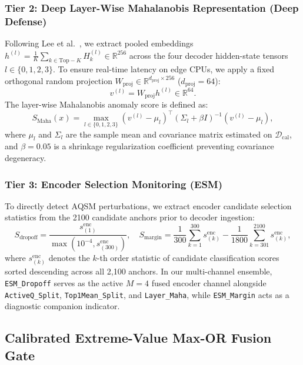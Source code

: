 \documentclass[preprint,12pt]{elsarticle}
\begin{document}
\subsubsection{Tier 2: Deep Layer-Wise Mahalanobis Representation (Deep Defense)}
Following Lee et al.~\cite{lee2018simple}, we extract pooled embeddings $h^{(l)} = \frac{1}{K} \sum_{k \in \mathrm{Top-}K} H_k^{(l)} \in \mathbb{R}^{256}$ across the four decoder hidden-state tensors $l \in \{0, 1, 2, 3\}$. To ensure real-time latency on edge CPUs, we apply a fixed orthogonal random projection $W_{\mathrm{proj}} \in \mathbb{R}^{d_{\mathrm{proj}} \times 256}$ ($d_{\mathrm{proj}} = 64$):
\begin{equation}
    v^{(l)} = W_{\mathrm{proj}} h^{(l)} \in \mathbb{R}^{64}.
\end{equation}
The layer-wise Mahalanobis anomaly score is defined as:
\begin{equation}
    S_{\mathrm{Maha}}(x) = \max_{l \in \{0, 1, 2, 3\}} \left( v^{(l)} - \mu_l \right)^\top \left( \Sigma_l + \beta I \right)^{-1} \left( v^{(l)} - \mu_l \right),
\end{equation}
where $\mu_l$ and $\Sigma_l$ are the sample mean and covariance matrix estimated on $\mathcal{D}_{\mathrm{cal}}$, and $\beta = 0.05$ is a shrinkage regularization coefficient preventing covariance degeneracy.

\subsubsection{Tier 3: Encoder Selection Monitoring (ESM)}
To directly detect AQSM perturbations, we extract encoder candidate selection statistics from the 2100 candidate anchors prior to decoder ingestion:
\begin{equation}
    S_{\mathrm{dropoff}} = \frac{s_{(1)}^{\mathrm{enc}}}{\max(10^{-4}, s_{(300)}^{\mathrm{enc}})}, \quad S_{\mathrm{margin}} = \frac{1}{300}\sum_{k=1}^{300} s_{(k)}^{\mathrm{enc}} - \frac{1}{1800}\sum_{k=301}^{2100} s_{(k)}^{\mathrm{enc}},
\end{equation}
where $s_{(k)}^{\mathrm{enc}}$ denotes the $k$-th order statistic of candidate classification scores sorted descending across all 2,100 anchors. In our multi-channel ensemble, \texttt{ESM\_Dropoff} serves as the active $M=4$ fused encoder channel alongside \texttt{ActiveQ\_Split}, \texttt{Top1Mean\_Split}, and \texttt{Layer\_Maha}, while \texttt{ESM\_Margin} acts as a diagnostic companion indicator.

\subsection{Calibrated Extreme-Value Max-OR Fusion Gate}
\end{document}
